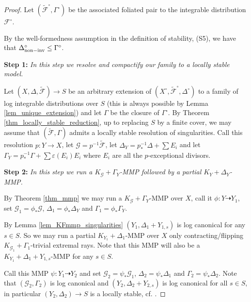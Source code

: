 \documentclass[12pt, a4paper]{amsart}
\newcounter{Theorem}
\theoremstyle{definition}
\theoremstyle{named}
\begin{document}
\begin{proof}

Let $(\tilde{\mathcal F}^\circ, \Gamma^\circ)$ be the associated foliated pair
to the integrable distribution $\mathcal F^\circ$.  



By the well-formedness assumption in the definition of stability, (S5), we have 
that $\Delta^\circ_{{\rm non-inv}} \leq \Gamma^\circ$.

\medskip

{\bf Step 1: }{\it  In this step we resolve and compactify our family to a
locally stable model.}

Let $(X, \Delta, \tilde{\mathcal F}) \rightarrow S$ be an arbitrary extension of $(X^\circ, \tilde{\mathcal F}^\circ, \Delta^\circ)$
to a family of log integrable distributions over $S$ (this is always possible by Lemma \ref{lem_unique_extension})
and let $\Gamma$ be the closure of $\Gamma^\circ$.
By Theorem \ref{thm_locally_stable_reduction},
up to replacing $S$ by a finite cover, we may assume that $(\tilde{\mathcal F}, \Gamma)$ admits a locally stable
resolution of singularities.
Call this resolution $p\colon Y \rightarrow X$, let $\mathcal G = p^{-1}\tilde{\mathcal F}$, let $\Delta_Y = p_*^{-1}\Delta+\sum E_i $ and let $\Gamma_Y = p_*^{-1}\Gamma+\sum \varepsilon(E_i)E_i$
where $E_i$ are all the $p$-exceptional divisors.


\medskip

{\bf Step 2: }{
\it In this step we run a $K_{\mathcal G}+\Gamma_Y$-MMP followed by a partial $K_{Y}+\Delta_Y$-MMP.}

By Theorem \ref{thm_mmp} we may run a $K_{\mathcal G}+\Gamma_Y$-MMP over $X$, 
call it $\phi\colon Y \dashrightarrow Y_1$, set $\mathcal G_1 = \phi_*\mathcal G$, 
$\Delta_1 = \phi_*\Delta_Y$ and $\Gamma_1 = \phi_*\Gamma_Y$.
 
By Lemma \ref{lem_KFmmp_singularities} $(Y_1, \Delta_1+Y_{1, s})$ is log canonical
for any $s \in S$. So we may run 
a partial $K_{Y_1}+\Delta_1$-MMP over $X$ only contracting/flipping 
$K_{\mathcal G_1}+\Gamma_1$-trivial extremal rays.
Note that this MMP will also be a $K_{Y_1}+\Delta_1+Y_{1, s}$-MMP
for any $s \in S$.

Call this MMP $\psi\colon Y_1 \dashrightarrow Y_2$ and set $\mathcal G_2 = \psi_*\mathcal G_1$, $\Delta_2 = \psi_*\Delta_1$ and $\Gamma_2 = \psi_*\Delta_2$.
Note that $(\mathcal G_2, \Gamma_2)$ is log canonical and $(Y_2, \Delta_2+Y_{2, s})$
is log canonical for all $s \in S$, 
in particular $(Y_2, \Delta_2) \rightarrow S$ is a locally stable, cf.  \cite[Definition-Theorem 2.3]{modbook}.


\end{proof}
\end{document}
